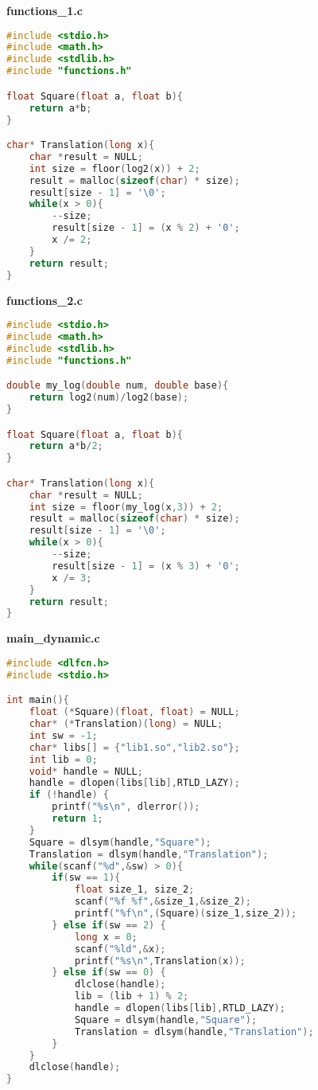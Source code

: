 \documentclass[pdf, unicode, 12pt, a4paper,oneside,fleqn]{article}
\begin{document}
{\large\textbf{functions\_1.c}}

\begin{lstlisting}[language=C]
#include <stdio.h>
#include <math.h>
#include <stdlib.h>
#include "functions.h"

float Square(float a, float b){
    return a*b;
}

char* Translation(long x){
    char *result = NULL;
    int size = floor(log2(x)) + 2;
    result = malloc(sizeof(char) * size);
    result[size - 1] = '\0';
    while(x > 0){
        --size;
        result[size - 1] = (x % 2) + '0';
        x /= 2;
    }
    return result;
}    
\end{lstlisting}

{\large\textbf{functions\_2.c}}

\begin{lstlisting}[language=C]
#include <stdio.h>
#include <math.h>
#include <stdlib.h>
#include "functions.h"

double my_log(double num, double base){
    return log2(num)/log2(base);
}

float Square(float a, float b){
    return a*b/2;
}

char* Translation(long x){
    char *result = NULL;
    int size = floor(my_log(x,3)) + 2;
    result = malloc(sizeof(char) * size);
    result[size - 1] = '\0';
    while(x > 0){
        --size;
        result[size - 1] = (x % 3) + '0';
        x /= 3;
    }
    return result;
}    
\end{lstlisting}

{\large\textbf{main\_dynamic.c}}

\begin{lstlisting}[language=C]
#include <dlfcn.h>
#include <stdio.h>

int main(){
    float (*Square)(float, float) = NULL;
    char* (*Translation)(long) = NULL;
    int sw = -1;
    char* libs[] = {"lib1.so","lib2.so"};
    int lib = 0;
    void* handle = NULL;
    handle = dlopen(libs[lib],RTLD_LAZY);
    if (!handle) {
        printf("%s\n", dlerror());
        return 1;
    }
    Square = dlsym(handle,"Square");
    Translation = dlsym(handle,"Translation");
    while(scanf("%d",&sw) > 0){
        if(sw == 1){
            float size_1, size_2;
            scanf("%f %f",&size_1,&size_2);
            printf("%f\n",(Square)(size_1,size_2));
        } else if(sw == 2) {
            long x = 0;
            scanf("%ld",&x);
            printf("%s\n",Translation(x));
        } else if(sw == 0) {
            dlclose(handle);
            lib = (lib + 1) % 2;
            handle = dlopen(libs[lib],RTLD_LAZY);
            Square = dlsym(handle,"Square");
            Translation = dlsym(handle,"Translation");
        }
    }
    dlclose(handle);
}
\end{lstlisting}
\end{document}
